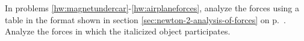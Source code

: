 In problems \ref{hw:magnetundercar}-\ref{hw:airplaneforces}, analyze the forces using a table in the format shown
in section \ref{sec:newton-2-analysis-of-forces}
on p.~\pageref{sec:newton-2-analysis-of-forces}. Analyze the forces in which the italicized object participates.
